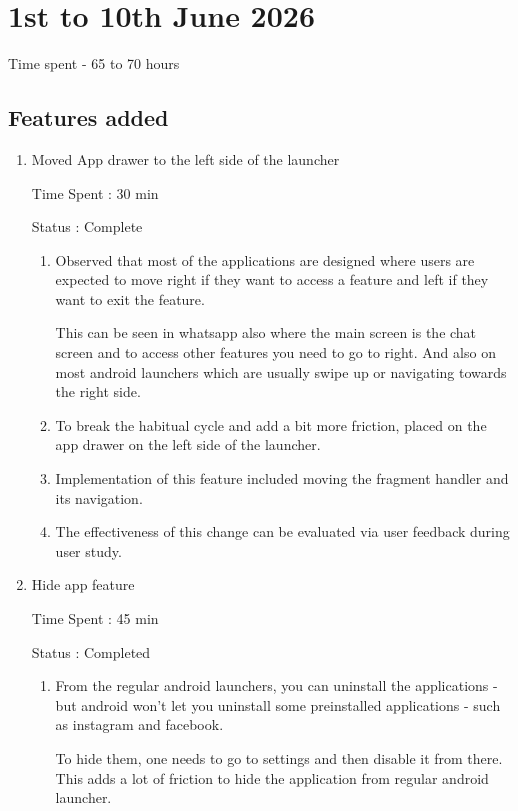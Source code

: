 \documentclass{article}
\begin{document}
\newpage
\section{1st to 10th June 2026}
Time spent - 65 to 70 hours


\subsection{Features added}

\begin{enumerate}
    \item Moved App drawer to the left side of the launcher
    
    Time Spent : 30 min

    Status : Complete
    \begin{enumerate}
        \item Observed that most of the applications are designed where users are expected to move right if they want to access a feature and left if they want to exit the feature. \cite{SwipeActionsDesign}

        This can be seen in whatsapp also where the main screen is the chat screen and to access other features you need to go to right. And also on most android launchers which are usually swipe up or navigating towards the right side.

        \item To break the habitual cycle and add a bit more friction, placed on the app drawer on the left side of the launcher.
        \item Implementation of this feature included moving the fragment handler and its navigation.
        \item The effectiveness of this change can be evaluated via user feedback during user study.
    \end{enumerate}
    \item Hide app feature
    
    Time Spent : 45 min
    
    Status : Completed
    \begin{enumerate}
        \item From the regular android launchers, you can uninstall the applications - but android won't let you uninstall some preinstalled applications - such as instagram and facebook.
        
        To hide them, one needs to go to settings and then disable it from there. This adds a lot of friction to hide the application from regular android launcher.


\end{enumerate}
\end{enumerate}
\end{document}
